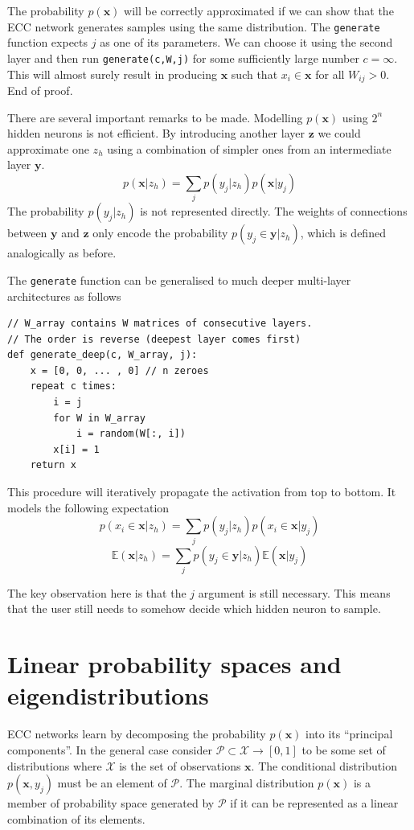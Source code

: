 \documentclass[12pt]{article}
\begin{document}
The probability $p(\boldsymbol{x})$ will be correctly approximated if we can show that the ECC network generates samples using the same distribution. The \texttt{generate} function expects $j$ as one of its parameters. We can choose it using the second layer and then run \texttt{generate(c,W,j)} for some sufficiently large number $c=\infty$. This will almost surely result in producing  $\boldsymbol{x}$ such that $x_i\in \boldsymbol{x}$ for all $W_{ij}>0$. End of proof. 

There are several important remarks to be made. Modelling $p(\boldsymbol{x})$ using $2^n$ hidden neurons is not efficient. By introducing another layer $\boldsymbol{z}$ we could approximate one $z_h$ using a combination of  simpler ones from an intermediate layer $\boldsymbol{y}$.
\[
p(\boldsymbol{x}|z_h) = \sum_{j} p(y_j|z_h) p(\boldsymbol{x}|y_j)
\] 
The probability $p(y_j|z_h)$ is not represented directly. The weights of connections between $\boldsymbol{y}$ and $\boldsymbol{z}$ only encode the probability $p(y_j\in \boldsymbol{y}|z_h)$, which is defined analogically as before. 

The \texttt{generate} function can be generalised to much deeper multi-layer architectures as follows
\begin{lstlisting}
// W_array contains W matrices of consecutive layers.
// The order is reverse (deepest layer comes first)
def generate_deep(c, W_array, j):
    x = [0, 0, ... , 0] // n zeroes
    repeat c times:
        i = j
        for W in W_array
            i = random(W[:, i])
        x[i] = 1
    return x
\end{lstlisting}
This procedure will iteratively propagate the activation from top to bottom. It models the following expectation
\[
p(x_i\in \boldsymbol{x}|z_h) = \sum_{j} p(y_j|z_h) p(x_i \in \boldsymbol{x}|y_j)
\]
\[
\mathbb{E}(\boldsymbol{x}|z_h) = \sum_{j} p(y_j\in \boldsymbol{y}|z_h) \mathbb{E}(\boldsymbol{x}|y_j)
\] 

The key observation here is that the $j$ argument is still necessary. This means that the user still needs to somehow decide which hidden neuron to sample.

 




\section{Linear probability spaces and eigendistributions}

ECC networks learn by decomposing the probability $p(\boldsymbol{x})$ into its ``principal components''.   In the general case consider  $\mathcal{P} \subset \mathcal{X} \rightarrow [0,1]$ to be some set of distributions where $\mathcal{X}$ is the set of observations $\boldsymbol{x}$. The conditional distribution $p(\boldsymbol{x},y_j)$ must be an element of $\mathcal{P}$. The marginal distribution $p(\boldsymbol{x})$ is a member of probability space generated by $\mathcal{P}$ if it can be represented as a linear combination of its elements.
\end{document}

